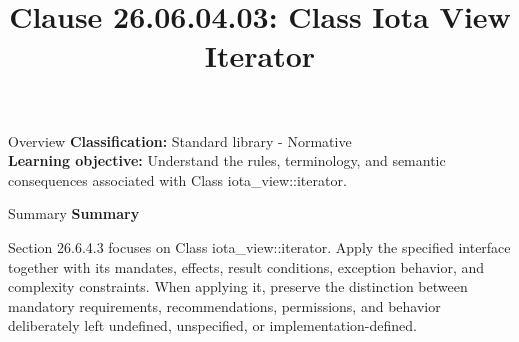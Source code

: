 \documentclass[10pt,letterpaper]{article}
\title{Clause 26.06.04.03: Class Iota View Iterator}
\author{}
\date{}
\begin{document}
\maketitle
\begin{CornellOverviewBox}{Overview}
\textbf{Classification:} Standard library - Normative\\[2pt]
\textbf{Learning objective:} Understand the rules, terminology, and semantic consequences associated with Class iota\_view::iterator.
\end{CornellOverviewBox}\begin{CornellSummaryBox}{Summary}
{\sffamily\bfseries\color{Accent} Summary}\par\vspace{3pt}Section 26.6.4.3 focuses on Class iota\_view::iterator. Apply the specified interface together with its mandates, effects, result conditions, exception behavior, and complexity constraints. When applying it, preserve the distinction between mandatory requirements, recommendations, permissions, and behavior deliberately left undefined, unspecified, or implementation-defined.
\end{CornellSummaryBox}
\end{document}

